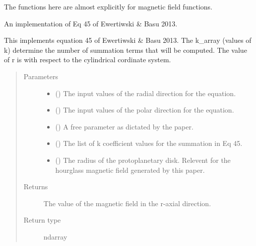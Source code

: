 \documentclass[letterpaper,10pt,english]{sphinxmanual}
\begin{document}
The functions here are almost explicitly for magnetic field functions.

\begin{fulllineitems}
\label{\detokenize{Backend.Ewertowski_Basu_2013:Backend.Ewertowski_Basu_2013.Ewer_Basu__B_r}}
An implementation of Eq 45 of Ewertiwski \& Basu 2013.

This implements equation 45 of Ewertiwski \& Basu 2013. The k\_array (values
of k) determine the number of summation terms that will be computed. The
value of r is with respect to the cylindrical cordinate system.
\begin{quote}\begin{description}
\item[{Parameters}] \leavevmode\begin{itemize}
\item {} 
 () \textendash{} The input values of the radial direction for the equation.

\item {} 
 () \textendash{} The input values of the polar direction for the equation.

\item {} 
 () \textendash{} A free parameter as dictated by the paper.

\item {} 
 () \textendash{} The list of k coefficient values for the summation in Eq 45.

\item {} 
 () \textendash{} The radius of the protoplanetary disk. Relevent for the hourglass
magnetic field generated by this paper.

\end{itemize}

\item[{Returns}] \leavevmode
{} \textendash{} The value of the magnetic field in the r-axial direction.

\item[{Return type}] \leavevmode
ndarray

\end{description}\end{quote}

\end{fulllineitems}
\end{document}
